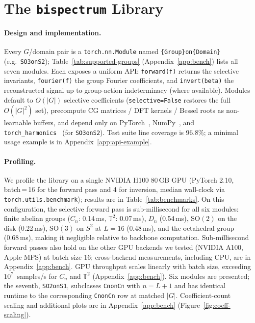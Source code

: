 \documentclass{article}
\theoremstyle{definition}
\theoremstyle{remark}
\theoremstyle{definition}
\begin{document}
\section{The \texttt{bispectrum} Library}
\label{sec:library}

\paragraph{Design and implementation.} \label{sec:design} Every $G$/domain pair is a \texttt{torch.nn.Module} named
\texttt{\{Group\}on\{Domain\}} (e.g.\ \texttt{SO3onS2});
Table~\ref{tab:supported-groups} (Appendix~\ref{app:bench}) lists all
seven modules. Each exposes a
uniform API: \texttt{forward(f)} returns the selective invariants,
\texttt{fourier(f)} the group Fourier coefficients, and
\texttt{invert(beta)} the reconstructed signal up to group-action
indeterminacy (where available). Modules default to $O(|G|)$
selective coefficients (\texttt{selective=False} restores the full
$O(|G|^2)$ set), precompute CG matrices / DFT kernels / Bessel
roots as non-learnable buffers, and depend only on
PyTorch~\citep{paszke2019pytorch}, NumPy~\citep{harris2020numpy},
and \texttt{torch\_harmonics}~\citep{bonev2023spherical} (for
\texttt{SO3onS2}). Test suite line coverage is 96.8\%; a minimal
usage example is in Appendix~\ref{app:api-example}.

\paragraph{Profiling.} \label{sec:benchmarks} We profile the library on a single NVIDIA H100 80\,GB GPU
(PyTorch 2.10, batch\,=\,16 for the forward pass and 4 for inversion,
median wall-clock via \texttt{torch.utils.benchmark}); results are in
Table~\ref{tab:benchmarks}.
On this configuration, the selective forward pass is sub-millisecond
for all six modules:
finite abelian groups ($C_n$: 0.14\,ms, $\mathbb{T}^2$: 0.07\,ms),
$D_n$ (0.54\,ms), $\mathrm{SO}(2)$ on the disk (0.22\,ms),
$\mathrm{SO}(3)$ on $S^2$ at $L{=}16$ (0.48\,ms), and the octahedral
group (0.68\,ms), making it negligible relative to backbone computation.
Sub-millisecond forward passes also hold on the other GPU backends we
tested (NVIDIA A100, Apple MPS) at batch size 16; cross-backend
measurements, including CPU, are in Appendix~\ref{app:bench}.
GPU throughput scales linearly with batch size, exceeding
$10^7$~samples/s for $C_n$ and $\mathbb{T}^2$
(Appendix~\ref{app:bench}). Six modules are presented; the seventh,
\texttt{SO2onS1}, subclasses \texttt{CnonCn} with $n = L{+}1$ and has
identical runtime to the corresponding \texttt{CnonCn} row at matched
$|G|$. Coefficient-count scaling and additional plots are in
Appendix~\ref{app:bench} (Figure~\ref{fig:coeff-scaling}).
\end{document}
